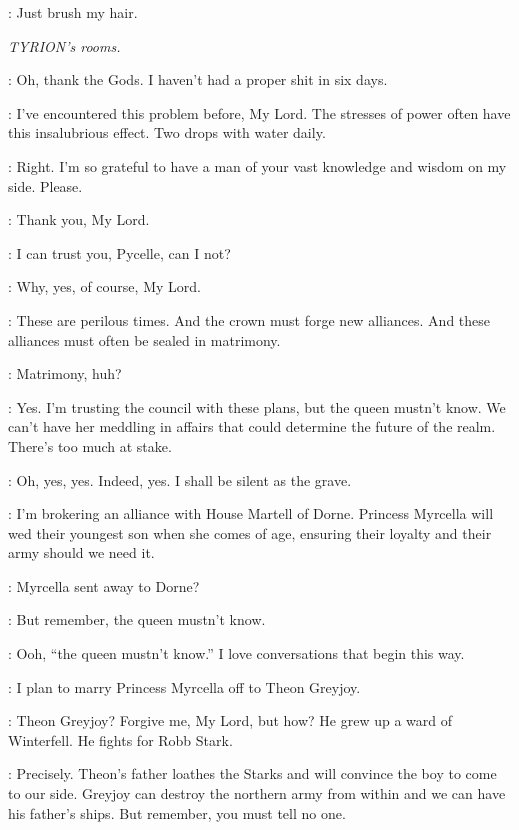 \SANSA: Just brush my hair. 



\scene

\textit{TYRION's rooms.} 


\TYRION: Oh, thank the Gods. I haven't had a proper shit in six days. 

\PYCELLE: I've encountered this problem before, My Lord. The stresses of power often have this insalubrious effect. Two drops with water daily. 

\TYRION: Right. I'm so grateful to have a man of your vast knowledge and wisdom on my side. Please. 


\PYCELLE: Thank you, My Lord. 

\TYRION: I can trust you, Pycelle, can I not? 

\PYCELLE: Why, yes, of course, My Lord. 

\TYRION: These are perilous times. And the crown must forge new alliances. And these alliances must often be sealed in matrimony. 

\PYCELLE: Matrimony, huh? 

\TYRION: Yes. I'm trusting the council with these plans, but the queen mustn't know. We can't have her meddling in affairs that could determine the future of the realm. There's too much at stake. 

\PYCELLE: Oh, yes, yes. Indeed, yes. I shall be silent as the grave. 

\TYRION: I'm brokering an alliance with House Martell of Dorne. Princess Myrcella will wed their youngest son when she comes of age, ensuring their loyalty and their army should we need it. 

\PYCELLE: Myrcella sent away to Dorne? 

\TYRION: But remember, the queen mustn't know. 


\VARYS: Ooh, ``the queen mustn't know.'' I love conversations that begin this way. 

\TYRION: I plan to marry Princess Myrcella off to Theon Greyjoy. 

\VARYS: Theon Greyjoy? Forgive me, My Lord, but how? He grew up a ward of Winterfell. He fights for Robb Stark. 

\TYRION: Precisely. Theon's father loathes the Starks and will convince the boy to come to our side. Greyjoy can destroy the northern army from within and we can have his father's ships. But remember, you must tell no one. 

